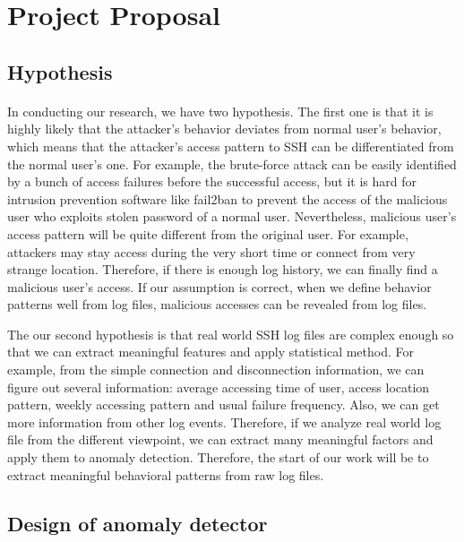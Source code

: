 \documentclass [11pt]{article}
\begin{document}
\section{Project Proposal}
\subsection{Hypothesis}
\paragraph{} 
In conducting our research, we have two hypothesis. The first one is that it is highly likely that the attacker's behavior deviates from normal user's behavior, which means that the attacker's access pattern to SSH can be differentiated from the normal user's one. For example, the brute-force attack can be easily identified by a bunch of access failures before the successful access, but it is hard for intrusion prevention software like fail2ban to prevent the access of the malicious user who exploits stolen password of a normal user. Nevertheless, malicious user's access pattern will be quite different from the original user. For example, attackers may stay access during the very short time or connect from very strange location. Therefore, if there is enough log history, we can finally find a malicious user's access. If our assumption is correct, when we define behavior patterns well from log files, malicious accesses can be revealed from log files.

The our second hypothesis is that real world SSH log files are complex enough so that we can extract meaningful features and apply statistical method. For example, from the simple connection and disconnection information, we can figure out several information: average accessing time of user, access location pattern, weekly accessing pattern and usual failure frequency. Also, we can get more information from other log events. Therefore, if we analyze real world log file from the different viewpoint, we can extract many meaningful factors and apply them to anomaly detection. Therefore, the start of our work will be to extract meaningful behavioral patterns from raw log files.

\subsection{Design of anomaly detector}
\end{document}
